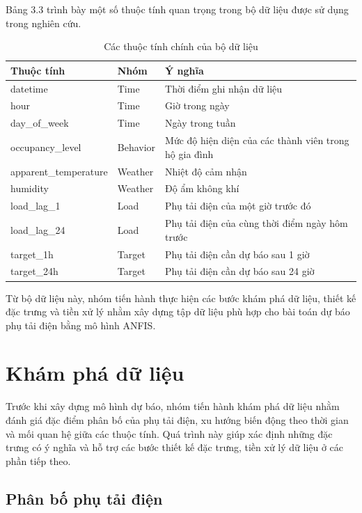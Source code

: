 Bảng 3.3 trình bày một số thuộc tính quan trọng trong bộ dữ liệu được sử dụng trong nghiên cứu.

\begin{table}[H]
\centering
\caption{Các thuộc tính chính của bộ dữ liệu}
\begin{tabular}{|p{4cm}|p{3cm}|p{6.5cm}|}
\hline
\textbf{Thuộc tính} & \textbf{Nhóm} & \textbf{Ý nghĩa} \\
\hline
datetime & Time & Thời điểm ghi nhận dữ liệu \\
\hline
hour & Time & Giờ trong ngày \\
\hline
day\_of\_week & Time & Ngày trong tuần \\
\hline
occupancy\_level & Behavior & Mức độ hiện diện của các thành viên trong hộ gia đình \\
\hline
apparent\_temperature & Weather & Nhiệt độ cảm nhận \\
\hline
humidity & Weather & Độ ẩm không khí \\
\hline
load\_lag\_1 & Load & Phụ tải điện của một giờ trước đó \\
\hline
load\_lag\_24 & Load & Phụ tải điện của cùng thời điểm ngày hôm trước \\
\hline
target\_1h & Target & Phụ tải điện cần dự báo sau 1 giờ \\
\hline
target\_24h & Target & Phụ tải điện cần dự báo sau 24 giờ \\
\hline
\end{tabular}
\end{table}

Từ bộ dữ liệu này, nhóm tiến hành thực hiện các bước khám phá dữ liệu, thiết kế đặc trưng và tiền xử lý nhằm xây dựng tập dữ liệu phù hợp cho bài toán dự báo phụ tải điện bằng mô hình ANFIS.

\section{Khám phá dữ liệu}

Trước khi xây dựng mô hình dự báo, nhóm tiến hành khám phá dữ liệu nhằm đánh giá đặc điểm phân bố của phụ tải điện, xu hướng biến động theo thời gian và mối quan hệ giữa các thuộc tính. Quá trình này giúp xác định những đặc trưng có ý nghĩa và hỗ trợ các bước thiết kế đặc trưng, tiền xử lý dữ liệu ở các phần tiếp theo.

\subsection{Phân bố phụ tải điện}

